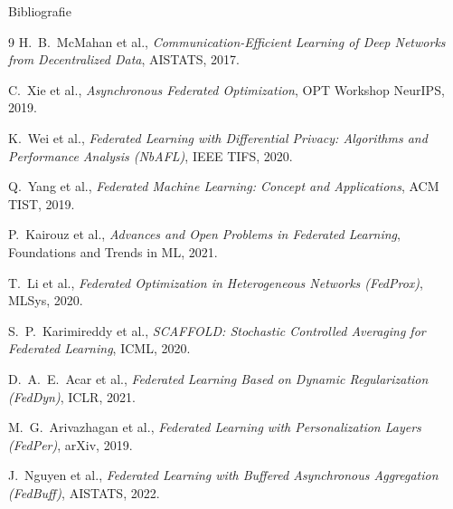 \documentclass{beamer}
\begin{document}

{
\begin{frame}{Bibliografie}
  \footnotesize
  \begin{thebibliography}{9}
      H.~B.~McMahan et al.,
      \emph{Communication-Efficient Learning of Deep Networks from Decentralized Data},
      AISTATS, 2017.

      C.~Xie et al.,
      \emph{Asynchronous Federated Optimization},
      OPT Workshop NeurIPS, 2019.

      K.~Wei et al.,
      \emph{Federated Learning with Differential Privacy: Algorithms and Performance Analysis (NbAFL)},
      IEEE TIFS, 2020.

      Q.~Yang et al.,
      \emph{Federated Machine Learning: Concept and Applications},
      ACM TIST, 2019.

      P.~Kairouz et al.,
      \emph{Advances and Open Problems in Federated Learning},
      Foundations and Trends in ML, 2021.

      T.~Li et al.,
      \emph{Federated Optimization in Heterogeneous Networks (FedProx)},
      MLSys, 2020.

      S.~P.~Karimireddy et al.,
      \emph{SCAFFOLD: Stochastic Controlled Averaging for Federated Learning},
      ICML, 2020.

      D.~A.~E.~Acar et al.,
      \emph{Federated Learning Based on Dynamic Regularization (FedDyn)},
      ICLR, 2021.

      M.~G.~Arivazhagan et al.,
      \emph{Federated Learning with Personalization Layers (FedPer)},
      arXiv, 2019.

      J.~Nguyen et al.,
      \emph{Federated Learning with Buffered Asynchronous Aggregation (FedBuff)},
      AISTATS, 2022.
  \end{thebibliography}
\end{frame}
}
\end{document}
